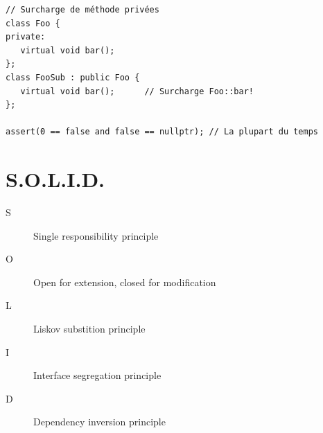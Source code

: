 \documentclass{article}
\begin{document}
\begin{multicols*}{3}
    \begin{lstlisting}
// Surcharge de méthode privées
class Foo {
private:
   virtual void bar();
};
class FooSub : public Foo {
   virtual void bar();      // Surcharge Foo::bar!
};

assert(0 == false and false == nullptr); // La plupart du temps
\end{lstlisting}

    \section*{S.O.L.I.D.}
    \begin{description}
        \item[S] Single responsibility principle
        \item[O] Open for extension, closed for modification
        \item[L] Liskov substition principle
        \item[I] Interface segregation principle
        \item[D] Dependency inversion principle
    \end{description}

\end{multicols*}
\end{document}

